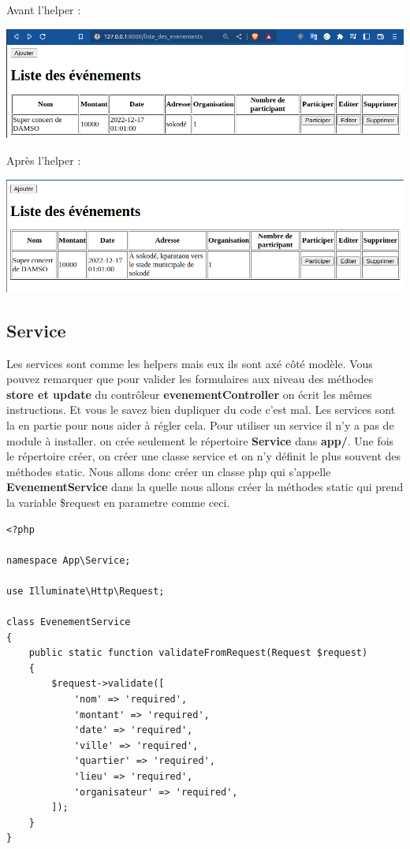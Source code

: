 \documentclass[12pt,a4paper]{article}
\begin{document}
Avant l'helper :
\begin{center}
\includegraphics[scale=0.5]{img/evenement_before_helper.png}
\end{center}
Après l'helper :
\begin{center}
\includegraphics[scale=0.5]{img/evenement_after_helper.png}
\end{center}

\subsection{Service}

Les services sont comme les helpers mais eux ils sont axé côté modèle.
Vous pouvez remarquer que pour valider les formulaires aux niveau des méthodes \textbf{store et update}
du contrôleur \textbf{evenementController} on écrit les mêmes instructions. Et vous le savez bien dupliquer du code c'est mal. Les services sont la en partie pour nous aider à régler cela.
Pour utiliser un service il n'y a pas de module à installer. on crée seulement le répertoire \textbf{Service} dans \textbf{app/}. Une fois le répertoire créer, on créer une classe service et on
n'y définit le plus souvent des méthodes static. Nous allons donc créer un classe php qui s'appelle
\textbf{EvenementService} dans la quelle nous allons créer la méthodes static \textbf{} qui prend la variable \$request en parametre comme ceci.

\begin{verbatim}
<?php

namespace App\Service;

use Illuminate\Http\Request;

class EvenementService
{
    public static function validateFromRequest(Request $request)
    {
        $request->validate([
            'nom' => 'required',
            'montant' => 'required',
            'date' => 'required',
            'ville' => 'required',
            'quartier' => 'required',
            'lieu' => 'required',
            'organisateur' => 'required',
        ]);
    }
}
\end{verbatim}
\end{document}
